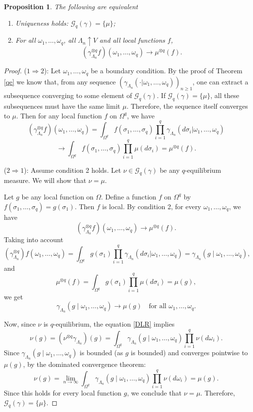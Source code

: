 \documentclass[11pt,reqno]{amsart}
\newtheorem{pro}{Proposition}
\numberwithin{equation}{section} \setcounter{tocdepth}{1}
\begin{document}
\begin{pro}
The following are equivalent
\begin{enumerate}
    \item Uniqueness holds: $\mathcal{G}_q(\gamma) = \{\mu\}$;
    \item For all $\omega_1, \dots, \omega_q$, all $\Lambda_n \uparrow V$ and all local functions $f$,
    $$
    (\gamma^{\otimes q}_{\Lambda_n}f)(\omega_1, \dots, \omega_q) \to \mu^{\otimes q}(f). 
    $$
\end{enumerate}
\end{pro}
\begin{proof}	($1 \Rightarrow 2$): Let $\omega_1, \dots, \omega_q$ be a boundary condition. By the proof of Theorem \ref{qe} we know that, from any sequence $(\gamma_{\Lambda_n}(\cdot|\omega_1,\dots, \omega_q))_{n\geq 1}$, one can extract a subsequence converging to some element of $\mathcal{G}_q(\gamma)$. If $\mathcal{G}_q(\gamma) = \{\mu\}$, all these subsequences must have the same limit $\mu$. Therefore, the sequence itself converges to $\mu$. Then for any local function $f$ on $\Omega^q$, we have
	$$
	(\gamma^{\otimes q}_{\Lambda_n} f)(\omega_1, \dots, \omega_q) = \int_{\Omega^q} f(\sigma_1, \dots, \sigma_q) \prod_{i=1}^q \gamma_{\Lambda_n}(d\sigma_i|\omega_1,\dots,\omega_q)$$ $$ \to \int_{\Omega^q} f(\sigma_1, \dots, \sigma_q) \prod_{i=1}^q \mu(d\sigma_i) = \mu^{\otimes q}(f).
	$$
	
	($2 \Rightarrow 1$): Assume condition 2 holds. Let $\nu \in \mathcal{G}_q(\gamma)$ be any $q$-equilibrium measure. We will show that $\nu = \mu$. 
	
	Let $g$ be any local function on $\Omega$. Define a function $f$ on $\Omega^q$ by $f(\sigma_1, \dots, \sigma_q) = g(\sigma_1)$. Then $f$ is local. By condition 2, for every $\omega_1, \dots, \omega_q$, we have
	$$
	(\gamma^{\otimes q}_{\Lambda_n} f)(\omega_1, \dots, \omega_q) \to \mu^{\otimes q}(f).
	$$
	Taking into account
	$$
	(\gamma^{\otimes q}_{\Lambda_n}) f(\omega_1, \dots, \omega_q) = \int_{\Omega^q} g(\sigma_1) \prod_{i=1}^q \gamma_{\Lambda_n}(d\sigma_i|\omega_1,\dots,\omega_q) = \gamma_{\Lambda_n}(g \mid \omega_1, \dots, \omega_q),
	$$
	and
	$$
	\mu^{\otimes q}(f) = \int_{\Omega^q} g(\sigma_1) \prod_{i=1}^q \mu(d\sigma_i) = \mu(g),
	$$
	we get
	$$
	\gamma_{\Lambda_n}(g \mid \omega_1, \dots, \omega_q) \to \mu(g) \quad \text{for all } \omega_1, \dots, \omega_q.
	$$
	
	Now, since $\nu$ is $q$-equilibrium,  the equation \eqref{DLR} implies
	$$
	\nu(g) = (\nu^{\otimes q} \gamma_{\Lambda_n})(g) = \int_{\Omega^q} \gamma_{\Lambda_n}(g \mid \omega_1, \dots, \omega_q) \prod_{i=1}^q\nu(d\omega_i).
	$$
	Since $\gamma_{\Lambda_n}(g \mid \omega_1, \dots, \omega_q)$ is bounded (as $g$ is bounded) and converges pointwise to $\mu(g)$, by the dominated convergence theorem:
	$$
	\nu(g) = \lim_{n\to\infty} \int_{\Omega^q} \gamma_{\Lambda_n}(g \mid \omega_1, \dots, \omega_q) \prod_{i=1}^q\nu(d\omega_i) = \mu(g).
	$$
	Since this holds for every local function $g$, we conclude that $\nu = \mu$. Therefore, $\mathcal{G}_q(\gamma) = \{\mu\}$.
\end{proof}
\end{document}
